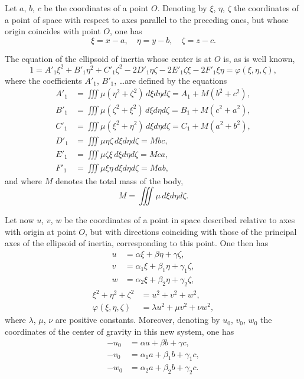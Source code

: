 \documentclass{article}
\begin{document}
Let $a$, $b$, $c$ be the coordinates of a point $O$. Denoting by $\xi$, $\eta$, $\zeta$ the coordinates of a point of space with respect to axes parallel to the preceding ones, but whose origin coincides with point $O$, one has
\[
\xi = x - a, \quad \eta = y - b, \quad \zeta = z - c.
\]

The equation of the ellipsoid of inertia whose center is at $O$ is, as is well known,
\[
1 = A'_1\xi^2 + B'_1\eta^2 + C'_1\zeta^2 - 2D'_1\eta\zeta - 2E'_1\zeta\xi - 2F'_1\xi\eta = \varphi(\xi, \eta, \zeta),
\]
where the coefficients $A'_1$, $B'_1$, \ldots are defined by the equations
\begin{align*}
A'_1 &= \iiint\mu(\eta^2 + \zeta^2)\,d\xi d\eta d\zeta = A_1 + M(b^2 + c^2), \\
B'_1 &= \iiint\mu(\zeta^2 + \xi^2)\,d\xi d\eta d\zeta = B_1 + M(c^2 + a^2), \\
C'_1 &= \iiint\mu(\xi^2 + \eta^2)\,d\xi d\eta d\zeta = C_1 + M(a^2 + b^2), \\
D'_1 &= \iiint\mu\eta\zeta\, d\xi d\eta d\zeta = Mbc, \\
E'_1 &= \iiint\mu\zeta\xi\, d\xi d\eta d\zeta = Mca, \\
F'_1 &= \iiint\mu\xi\eta\, d\xi d\eta d\zeta = Mab,
\end{align*}
and where $M$ denotes the total mass of the body,
\[
M = \iiint\mu\, d\xi d\eta d\zeta.
\]

Let now $u$, $v$, $w$ be the coordinates of a point in space described relative to axes with origin at point $O$, but with directions coinciding with those of the principal axes of the ellipsoid of inertia, corresponding to this point. One then has
\begin{align*}
u &= \alpha\xi + \beta\eta + \gamma\zeta, \\
v &= \alpha_1\xi + \beta_1\eta + \gamma_1\zeta, \\
w &= \alpha_2\xi + \beta_2\eta + \gamma_2\zeta,
\end{align*}
\begin{align*}
\xi^2 + \eta^2 + \zeta^2 &= u^2 + v^2 + w^2, \\
\varphi(\xi, \eta, \zeta) &= \lambda u^2 + \mu v^2 + \nu w^2,
\end{align*}
where $\lambda$, $\mu$, $\nu$ are positive constants.
Moreover, denoting by $u_0$, $v_0$, $w_0$ the coordinates of the center of gravity in this new system, one has
\begin{align*}
-u_0 &= \alpha a + \beta b + \gamma c, \\
-v_0 &= \alpha_1 a + \beta_1 b + \gamma_1 c, \\
-w_0 &= \alpha_2 a + \beta_2 b + \gamma_2 c.
\end{align*}
\end{document}
